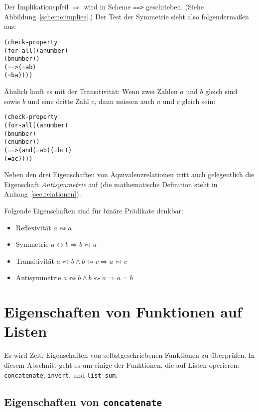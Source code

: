 Der Implikationspfeil $\Rightarrow$ wird in Scheme
\texttt{==>} geschrieben.  (Siehe
Abbildung~\ref{scheme:implies}.)  Der Test der
Symmetrie sieht also folgendermaßen aus:
%
\begin{alltt}
(check-property
 (for-all ((a number)
           (b number))
   (==> (= a b)
        (= b a))))
\end{alltt}
%
Ähnlich läuft es mit der Transitivität: Wenn zwei Zahlen $a$ und $b$
gleich sind sowie $b$ und eine dritte Zahl $c$, dann müssen auch $a$
und $c$ gleich sein:
%
\begin{alltt}
(check-property
 (for-all ((a number)
           (b number)
           (c number))
   (==> (and (= a b) (= b c))
        (= a c))))
\end{alltt}
%
Neben den drei Eigenschaften von Äquivalenzrelationen tritt auch
gelegentlich die Eigenschaft
\textit{Antisymmetrie} auf (die mathematische
Definition steht in Anhang~\ref{sec:relationen}).

\begin{mantra}
%
Folgende Eigenschaften sind für binäre Prädikate denkbar:
\begin{itemize}
\item Reflexivität $a \leftrightsquigarrow a$
\item Symmetrie $a \leftrightsquigarrow b \Rightarrow b \leftrightsquigarrow a$
\item Transitivität $a \leftrightsquigarrow b \wedge b
  \leftrightsquigarrow c
  \Rightarrow a \leftrightsquigarrow c$
\item Antisymmetrie $a \leftrightsquigarrow b \wedge  b
  \leftrightsquigarrow a \Rightarrow a = b$
\end{itemize}
\end{mantra}

\section{Eigenschaften von Funktionen auf Listen}

Es wird Zeit, Eigenschaften von selbstgeschriebenen Funktionen zu
überprüfen.  In diesem Abschnitt geht es um einige der Funktionen, die
auf Listen operieren: \texttt{concatenate}, \texttt{invert},
und \texttt{list-sum}.

\subsection{Eigenschaften von \texttt{concatenate}}

